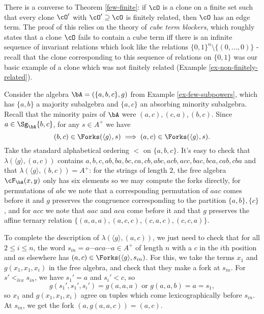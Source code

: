 \begin{rem} There is a converse to Theorem \ref{few-finite}: if $\cO$ is a clone on a finite set such that every clone $\cO'$ with $\cO' \supseteq \cO$ is finitely related, then $\cO$ has an edge term. The proof of this relies on the theory of \emph{cube term blockers}, which roughly states that a clone $\cO$ fails to contain a cube term iff there is an infinite sequence of invariant relations which look like the relations $\{0,1\}^n\setminus\{(0,...,0)\}$ - recall that the clone corresponding to this sequence of relations on $\{0,1\}$ was our basic example of a clone which was not finitely related (Example \ref{ex-non-finitely-related}).
\end{rem}

\begin{ex} Consider the algebra $\bA = (\{a,b,c\},g)$ from Example \ref{ex-few-subpowers}, which has $\{a,b\}$ a majority subalgebra and $\{a,c\}$ an absorbing minority subalgebra. Recall that the minority pairs of $\bA$ were $(a,c), (c,a), (b,c)$. Since $a \in \Sg_{\bA}\{b,c\}$, for any $s \in A^+$ we have
\[
(b,c) \in \Forks(\langle g\rangle, s) \implies (a,c) \in \Forks(\langle g\rangle, s).
\]
Take the standard alphabetical ordering $<$ on $\{a,b,c\}$. It's easy to check that $\lambda(\langle g\rangle,(a,c))$ contains $a, b, c, ab, ba, bc, ca, cb, abc, acb, acc, bac, bca, cab, cba$ and that $\lambda(\langle g \rangle, (b,c)) = A^+$: for the strings of length $2$, the free algebra $\cF_{\bA}(x,y)$ only has six elements so we may compute the forks directly, for permutations of $abc$ we note that a corresponding permutation of $aac$ comes before it and $g$ preserves the congruence corresponding to the partition $\{a,b\},\{c\}$, and for $acc$ we note that $aac$ and $aca$ come before it and that $g$ preserves the affine ternary relation $\{(a,a,a),(a,c,c),(c,a,c),(c,c,a)\}$.

To complete the description of $\lambda(\langle g\rangle,(a,c))$, we just need to check that for all $2 \le i \le n$, the word $s_{in} = a\cdots aca\cdots a \in A^+$ of length $n$ with a $c$ in the $i$th position and $a$s elsewhere has $(a,c) \in \Forks(\langle g\rangle, s_{in})$. For this, we take the terms $x_1$ and $g(x_1,x_1,x_i)$ in the free algebra, and check that they make a fork at $s_{in}$. For $s' <_{lex} s_{in}$, we have $s_1' = a$ and $s_i' < c$, so
\[
g(s_1',s_1',s_i') = g(a,a,a)\text{ or }g(a,a,b) = a = s_1,
\]
so $x_1$ and $g(x_1,x_1,x_i)$ agree on tuples which come lexicographically before $s_{in}$. At $s_{in}$, we get the fork $(a,g(a,a,c)) = (a,c)$.
\end{ex}

